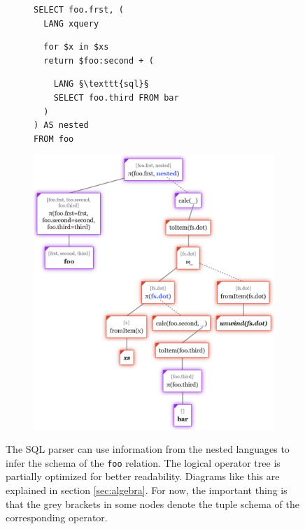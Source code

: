 \begin{figure}[htpb]
    \begin{subfigure}[b]{\textwidth}
    \begin{tcolorbox}[colback=white, colframe=black, boxrule=1pt, arc=0pt]
        \begin{verbatim}
SELECT foo.frst, (
  LANG xquery
        \end{verbatim}
        \nestedMintedVspace
        \begin{verbatim}
  for $x in $xs
  return $foo:second + (
        \end{verbatim}
        \nestedMintedVspace
        \begin{verbatim}
    LANG §\texttt{sql}§
    SELECT foo.third FROM bar
  )
) AS nested
FROM foo
        \end{verbatim}
    \end{tcolorbox}
    \end{subfigure}
    
    \medskip
    
    \begin{subfigure}[b]{\textwidth}
        \centering
        \includegraphics[width=360pt]{img/tree-sql-infer.png}
    \end{subfigure}
    
    \caption{The SQL parser can use information from the nested languages to infer the schema of the \texttt{foo} relation. The logical operator tree is partially optimized for better readability. Diagrams like this are explained in section \ref{sec:algebra}. For now, the important thing is that the grey brackets in some nodes denote the tuple schema of the corresponding operator.}
\end{figure}

